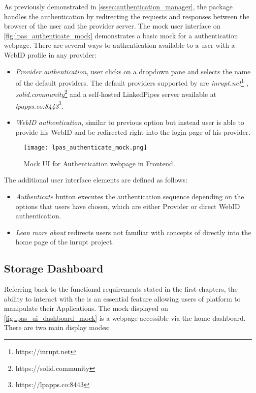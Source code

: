 As previously demonstrated in \autoref{sssec:authentication_manager}, the \lpas{} package handles the authentication by redirecting the requests and responses between the browser of the user and the \solid{} provider server. The mock user interface on \autoref{fig:lpas_authenticate_mock} demonstrates a basic mock for a authentication webpage. There are several ways to authentication available to a \lpa{} user with a WebID profile in any \solid provider:
\begin{itemize}
    \item \textit{Provider authentication}, user clicks on a dropdown pane and selects the name of the default providers. The default providers supported by \lpas{} are \textit{inrupt.net}\footnote{https://inrupt.net} , \textit{solid.community}\footnote{https://solid.community} and a self-hosted LinkedPipes server available at \textit{lpapps.co:8443}\footnote{https://lpapps.co:8443}.
    \item \textit{WebID authentication}, similar to previous option but instead user is able to provide his WebID and be redirected right into the login page of his provider.
\end{itemize} 

\begin{figure}[h]
\centering
\texttt{[image: lpas\_authenticate\_mock.png]}
\caption{Mock UI for Authentication webpage in \lpa{} Frontend.}
\label{fig:lpas_authenticate_mock}
\end{figure}

The additional user interface elements are defined as follows:

\begin{itemize}
    \item \textit{Authenticate} button executes the authentication sequence depending on the options that users have chosen, which are either Provider or direct WebID authentication.
    \item \textit{Lean more about \solid{}} redirects users not familiar with concepts of \solid{} directly into the home page of the inrupt project.
\end{itemize}
 

\subsection{Storage Dashboard}

Referring back to the functional requirements stated in the first chapters, the ability to interact with the \lpas{} is an essential feature allowing users of \lpa{} platform to manipulate their Applications. The mock displayed on \ref{fig:lpas_ui_dashboard_mock} is a webpage accessible via the home dashboard. There are two main display modes:

